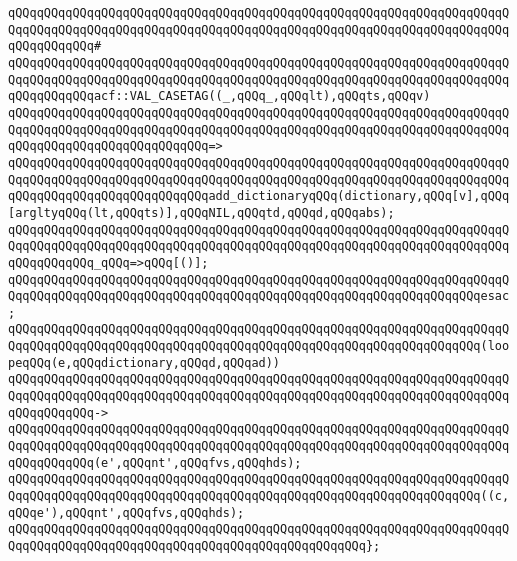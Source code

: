 \verb|qQQqqQQqqQQqqQQqqQQqqQQqqQQqqQQqqQQqqQQqqQQqqQQqqQQqqQQqqQQqqQQqqQQqqQQqqQQqqQQqqQQqqQQqqQQqqQQqqQQqqQQqqQQqqQQqqQQqqQQqqQQqqQQqqQQqqQQqqQQqqQQqqQQqqQQq#|\newline
\verb|qQQqqQQqqQQqqQQqqQQqqQQqqQQqqQQqqQQqqQQqqQQqqQQqqQQqqQQqqQQqqQQqqQQqqQQqqQQqqQQqqQQqqQQqqQQqqQQqqQQqqQQqqQQqqQQqqQQqqQQqqQQqqQQqqQQqqQQqqQQqqQQqqQQqqQQqacf::VAL_CASETAG((_,qQQq_,qQQqlt),qQQqts,qQQqv)|\newline
\verb|qQQqqQQqqQQqqQQqqQQqqQQqqQQqqQQqqQQqqQQqqQQqqQQqqQQqqQQqqQQqqQQqqQQqqQQqqQQqqQQqqQQqqQQqqQQqqQQqqQQqqQQqqQQqqQQqqQQqqQQqqQQqqQQqqQQqqQQqqQQqqQQqqQQqqQQqqQQqqQQqqQQqqQQq=>|\newline
\verb|qQQqqQQqqQQqqQQqqQQqqQQqqQQqqQQqqQQqqQQqqQQqqQQqqQQqqQQqqQQqqQQqqQQqqQQqqQQqqQQqqQQqqQQqqQQqqQQqqQQqqQQqqQQqqQQqqQQqqQQqqQQqqQQqqQQqqQQqqQQqqQQqqQQqqQQqqQQqqQQqqQQqqQQqadd_dictionaryqQQq(dictionary,qQQq[v],qQQq[argltyqQQq(lt,qQQqts)],qQQqNIL,qQQqtd,qQQqd,qQQqabs);|\newline
\newline
\verb|qQQqqQQqqQQqqQQqqQQqqQQqqQQqqQQqqQQqqQQqqQQqqQQqqQQqqQQqqQQqqQQqqQQqqQQqqQQqqQQqqQQqqQQqqQQqqQQqqQQqqQQqqQQqqQQqqQQqqQQqqQQqqQQqqQQqqQQqqQQqqQQqqQQqqQQq_qQQq=>qQQq[()];|\newline
\verb|qQQqqQQqqQQqqQQqqQQqqQQqqQQqqQQqqQQqqQQqqQQqqQQqqQQqqQQqqQQqqQQqqQQqqQQqqQQqqQQqqQQqqQQqqQQqqQQqqQQqqQQqqQQqqQQqqQQqqQQqqQQqqQQqqQQqqQQqesac;|\newline
\newline
\verb|qQQqqQQqqQQqqQQqqQQqqQQqqQQqqQQqqQQqqQQqqQQqqQQqqQQqqQQqqQQqqQQqqQQqqQQqqQQqqQQqqQQqqQQqqQQqqQQqqQQqqQQqqQQqqQQqqQQqqQQqqQQqqQQqqQQqqQQq(loopeqQQq(e,qQQqdictionary,qQQqd,qQQqad))|\newline
\verb|qQQqqQQqqQQqqQQqqQQqqQQqqQQqqQQqqQQqqQQqqQQqqQQqqQQqqQQqqQQqqQQqqQQqqQQqqQQqqQQqqQQqqQQqqQQqqQQqqQQqqQQqqQQqqQQqqQQqqQQqqQQqqQQqqQQqqQQqqQQqqQQqqQQqqQQq->|\newline
\verb|qQQqqQQqqQQqqQQqqQQqqQQqqQQqqQQqqQQqqQQqqQQqqQQqqQQqqQQqqQQqqQQqqQQqqQQqqQQqqQQqqQQqqQQqqQQqqQQqqQQqqQQqqQQqqQQqqQQqqQQqqQQqqQQqqQQqqQQqqQQqqQQqqQQqqQQq(e',qQQqnt',qQQqfvs,qQQqhds);|\newline
\newline
\verb|qQQqqQQqqQQqqQQqqQQqqQQqqQQqqQQqqQQqqQQqqQQqqQQqqQQqqQQqqQQqqQQqqQQqqQQqqQQqqQQqqQQqqQQqqQQqqQQqqQQqqQQqqQQqqQQqqQQqqQQqqQQqqQQqqQQqqQQq((c,qQQqe'),qQQqnt',qQQqfvs,qQQqhds);|\newline
\verb|qQQqqQQqqQQqqQQqqQQqqQQqqQQqqQQqqQQqqQQqqQQqqQQqqQQqqQQqqQQqqQQqqQQqqQQqqQQqqQQqqQQqqQQqqQQqqQQqqQQqqQQqqQQqqQQqqQQqqQQq};|\newline
